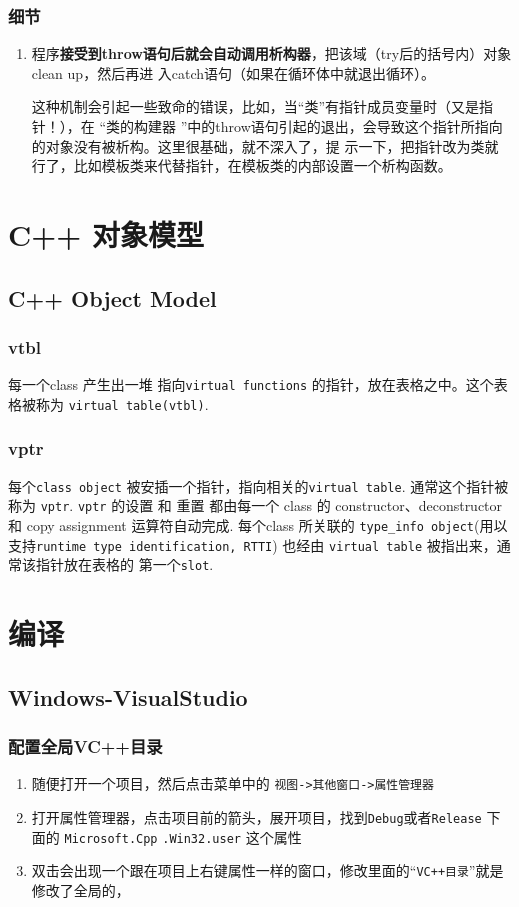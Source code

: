 \documentclass[UTF8,a4paper,12pt]{ctexbook} %
\begin{document}
	\subsection{细节}
		\begin{enumerate}
			\item 程序\textbf{接受到throw语句后就会自动调用析构器}，把该域（try后的括号内）对象clean up，然后再进
			入catch语句（如果在循环体中就退出循环）。
			
			这种机制会引起一些致命的错误，比如，当“类”有指针成员变量时（又是指针！），在 “类的构建器
			”中的throw语句引起的退出，会导致这个指针所指向的对象没有被析构。这里很基础，就不深入了，提
			示一下，把指针改为类就行了，比如模板类来代替指针，在模板类的内部设置一个析构函数。
		\end{enumerate}	

\chapter{C++ 对象模型}
	\section{C++ Object Model}	
		\subsection{vtbl}
			每一个class 产生出一堆 指向\verb|virtual functions| 的指针，放在表格之中。这个表格被称为 \verb|virtual table(vtbl)|.
		\subsection{vptr}
			每个\verb|class object| 被安插一个指针，指向相关的\verb|virtual table|. 通常这个指针被称为 \verb|vptr|. \verb|vptr| 的设置 和 重置 都由每一个 class 的 constructor、deconstructor 和 copy assignment 运算符自动完成. 每个class 所关联的 \verb|type_info object|(用以 支持\verb|runtime type identification, RTTI|) 也经由 \verb|virtual table| 被指出来，通常该指针放在表格的 第一个\verb|slot|.
		
\chapter{编译}
	\section{Windows-VisualStudio}
		\subsection{配置全局VC++目录}
			\begin{enumerate}
				\item  随便打开一个项目，然后点击菜单中的 \verb|视图->其他窗口->属性管理器|
				
				\item  打开属性管理器，点击项目前的箭头，展开项目，找到\verb|Debug|或者\verb|Release| 下面的 \verb|Microsoft.Cpp| \verb|.Win32.user| 这个属性
				
				\item  双击会出现一个跟在项目上右键属性一样的窗口，修改里面的“\verb|VC++目录|”就是修改了全局的，
			\end{enumerate}
\end{document}
